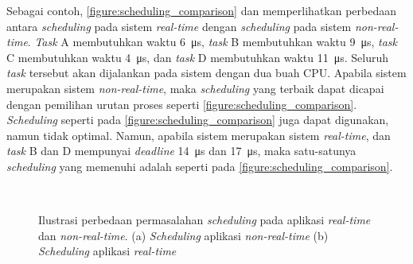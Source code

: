 Sebagai contoh, \autoref{figure:scheduling_comparison}
dan  memperlihatkan perbedaan antara
\textit{scheduling} pada sistem \textit{real-time} dengan \textit{scheduling} pada sistem
\textit{non-real-time}.  \textit{Task} A membutuhkan waktu \SI{6}{\micro\second}, \textit{task}
B membutuhkan waktu \SI{9}{\micro\second}, \textit{task} C membutuhkan waktu
\SI{4}{\micro\second}, dan \textit{task} D membutuhkan waktu \SI{11}{\micro\second}.  Seluruh
\textit{task} tersebut akan dijalankan pada sistem dengan dua buah CPU.  Apabila sistem
merupakan sistem \textit{non-real-time}, maka \textit{scheduling} yang terbaik dapat dicapai
dengan pemilihan urutan proses seperti
\autoref{figure:scheduling_comparison}.
\textit{Scheduling} seperti pada
\autoref{figure:scheduling_comparison} juga dapat
digunakan, namun tidak optimal.  Namun, apabila sistem merupakan sistem \textit{real-time}, dan
\textit{task} B dan D mempunyai \textit{deadline} \SI{14}{\micro\second} dan
\SI{17}{\micro\second}, maka satu-satunya \textit{scheduling} yang memenuhi adalah seperti pada
\autoref{figure:scheduling_comparison}.

\begin{figure}[htbp]
    \centering
    \vspace{18pt}
    \\
    \vspace{18pt}\hspace{24pt}
    \caption[Ilustrasi perbedaan permasalahan \textit{scheduling} pada aplikasi \textit{real-time} dan \textit{non-real-time}]{Ilustrasi perbedaan permasalahan \textit{scheduling} pada aplikasi \textit{real-time} dan \textit{non-real-time}. (a) \textit{Scheduling} aplikasi \textit{non-real-time} (b) \textit{Scheduling} aplikasi \textit{real-time}}
    \label{figure:scheduling_comparison}
\end{figure}

